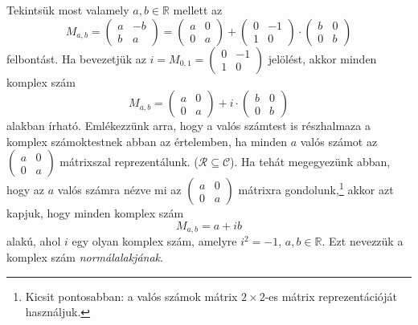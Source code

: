 \documentclass[9pt,showtrims]{memoir}
\theoremstyle{plain}
\theoremstyle{remark}
\theoremstyle{definition}
\begin{document}
Tekintsük most valamely $a,b\in\mathbb{R}$ mellett az 
\[
    M_{a,b}=
    \begin{pmatrix}
        a&-b\\
        b&a
    \end{pmatrix}
    =
    \begin{pmatrix}
        a&0\\
        0&a
    \end{pmatrix}
    +
    \begin{pmatrix}
        0&-1\\
        1&0
    \end{pmatrix}
    \cdot
    \begin{pmatrix}
        b&0\\
        0&b
    \end{pmatrix}
\]
felbontást.
Ha bevezetjük az 
\(
    i=M_{0,1}=
    \begin{pmatrix}
        0&-1\\
        1&0
    \end{pmatrix}
\)
jelölést, akkor minden komplex szám
\[
    M_{a,b}=
    \begin{pmatrix}
        a&0\\
        0&a
    \end{pmatrix}
    +
    i
    \cdot
    \begin{pmatrix}
        b&0\\
        0&b
    \end{pmatrix}
\]
alakban írható.
Emlékezzünk arra, 
hogy a valós számtest is részhalmaza a komplex számoktestnek abban az értelemben, 
ha minden $a$ valós számot az
\begin{math}
    \begin{pmatrix}
        a&0\\
        0&a
    \end{pmatrix}
\end{math}
mátrixszal reprezentálunk. ($\mathcal{R}\subseteq\mathcal{C}$).
Ha tehát megegyezünk abban, hogy az $a$ valós számra nézve mi az
\(
    \begin{pmatrix}
        a&0\\
        0&a
    \end{pmatrix}
\)
mátrixra gondolunk,\footnote{Kicsit pontosabban: a valós számok mátrix $2\times 2$-es mátrix reprezentációját használjuk.}
akkor azt kapjuk, hogy minden komplex szám
\[
    M_{a,b}=a+ib
\]
alakú, ahol $i$ egy olyan komplex szám, amelyre $i^2=-1$, $a,b\in\mathbb{R}$.
Ezt nevezzük a komplex szám \emph{normálalakjának}.
\end{document}
